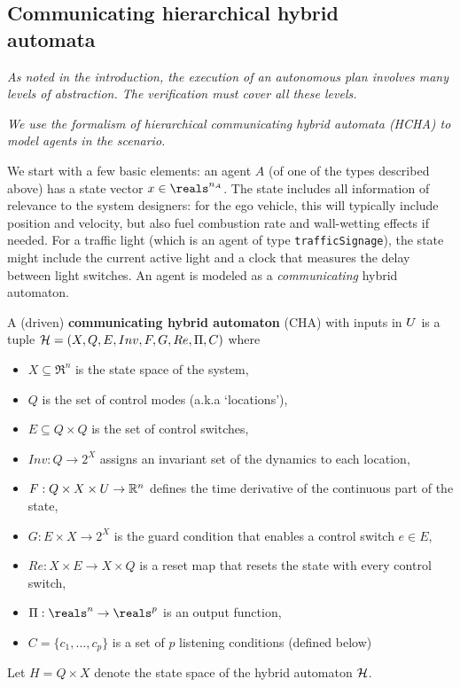 \subsection{Communicating hierarchical hybrid \\automata}
\label{HCHA}
{\it As noted in the introduction, the execution of an autonomous plan involves many levels of abstraction. 
The verification must cover all these levels.}

{\it We use the formalism of hierarchical communicating hybrid automata (HCHA) to model agents in the scenario. }

We start with a few basic elements:
an agent $A$ (of one of the types described above) has a state vector $x \in \reals^{n_A}$.
The state includes all information of relevance to the system designers: for the ego vehicle, this will typically include position and velocity, but also fuel combustion rate and wall-wetting effects if needed.
For a traffic light (which is an agent of type \texttt{trafficSignage}), the state might include the current active light and a clock that measures the delay between light switches.
An agent is modeled as a \emph{communicating} hybrid automaton.

\begin{defn}
A (driven) \textbf{communicating hybrid automaton} (CHA) with inputs in $U$ 
is a tuple $\mathcal{H} = (X, Q, E, Inv, F, G, Re, \Pi, C)$
where 
\begin{itemize}\
\item $X \subseteq \Re^n$ is the state space of the system, 
\item $Q$ is the set of control modes (a.k.a `locations'), 
\item $E \subseteq Q \times Q$ is the set of control switches, 
\item $Inv : Q \rightarrow 2^X$ assigns an invariant set of the dynamics to each location, 
\item $F : Q \times X \times U \rightarrow \mathbb{R}^n$ defines the time derivative of the continuous part of the state, 
\item $G : E \times X \rightarrow 2^X$ is the guard condition that enables a control switch $e \in E$,
\item $Re : X \times E \rightarrow X \times Q$ is a reset map that resets the state with every control switch,
\item $\funcOut: \reals^n \rightarrow \reals^p$ is an output function,
\item $C = \{c_1,\ldots,c_p\}$ is a set of $p$ listening conditions (defined below)
\end{itemize}
  
Let $H = Q \times X$ denote the state space of the hybrid automaton $\mathcal{H}$.
	\end{defn}
	
